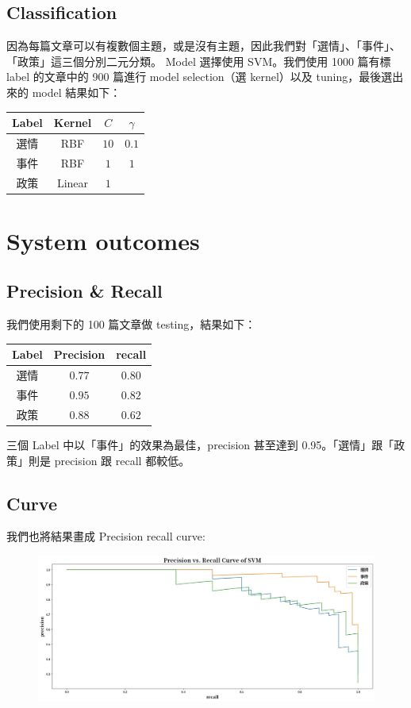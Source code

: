 \documentclass[12pt,cleanfoot,twocolumn]{asme2ej}
\begin{document}
\subsection*{Classification}
因為每篇文章可以有複數個主題，或是沒有主題，因此我們對「選情」、「事件」、「政策」這三個分別二元分類。
Model 選擇使用 SVM。我們使用 1000 篇有標 label 的文章中的 900 篇進行 model selection（選 kernel）以及 tuning，最後選出來的 model 結果如下：
\\
\begin{center}
        \begin{tabular}{c|c|c|c}
                Label & Kernel & $C$  & $\gamma$ \\
                \hline
                選情  & RBF    & $10$ & $0.1$    \\
                事件  & RBF    & $1$  & $1$      \\
                政策  & Linear & $1$  &          \\
        \end{tabular}
\end{center}

\section{System outcomes}
\subsection{Precision \& Recall}
我們使用剩下的 100 篇文章做 testing，結果如下：
\begin{center}
        \begin{tabular}{c|c|c}
                Label & Precision & recall \\
                \hline
                選情  & $0.77$    & $0.80$ \\
                事件  & $0.95$    & $0.82$ \\
                政策  & $0.88$    & $0.62$ \\
        \end{tabular}
\end{center}
三個 Label 中以「事件」的效果為最佳，precision 甚至達到 0.95。「選情」跟「政策」則是 precision 跟 recall 都較低。

\subsection{Curve}
我們也將結果畫成 Precision recall curve:
\begin{figure}
        \includegraphics[width=\textwidth]{pr_curve}
\end{figure}
\end{document}
